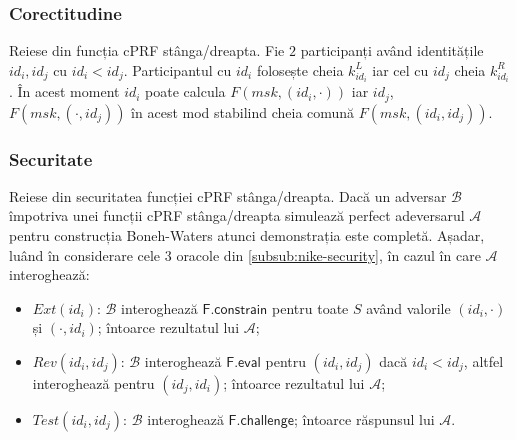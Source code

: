 \documentclass[oneside, 12pt]{book}
\begin{document}
\subsubsection{Corectitudine}

Reiese din funcția cPRF stânga/dreapta. Fie $2$ participanți având identitățile $id_i, id_j$ cu $id_i < id_j$. Participantul cu $id_i$ folosește cheia $k^{L}_{id_i}$ iar cel cu $id_j$ cheia $k^{R}_{id_i}$. În acest moment $id_i$ poate calcula $F(msk, (id_i, \cdot))$ iar $id_j$, $F(msk, (\cdot, id_j))$ în acest mod stabilind cheia comună $F(msk, (id_i, id_j))$.

\subsubsection{Securitate}

Reiese din securitatea funcției cPRF stânga/dreapta. Dacă un adversar $\mathcal{B}$ împotriva unei funcții cPRF stânga/dreapta simulează perfect adeversarul $\mathcal{A}$ pentru construcția Boneh-Waters atunci demonstrația este completă. Așadar, luând în considerare cele $3$ oracole din \ref{subsub:nike-security}, în cazul în care $\mathcal{A}$ interoghează:
\begin{itemize}
	\item $Ext(id_i)$: $\mathcal{B}$ interoghează $\mathsf{F.constrain}$ pentru toate $S$ având valorile $(id_i, \cdot)$ și $(\cdot, id_i)$; întoarce rezultatul lui $\mathcal{A}$;
	\item $Rev(id_i, id_j)$: $\mathcal{B}$ interoghează $\mathsf{F.eval}$ pentru $(id_i, id_j)$ dacă $id_i < id_j$, altfel interoghează pentru $(id_j, id_i)$; întoarce rezultatul lui $\mathcal{A}$;
	\item $Test(id_i, id_j)$: $\mathcal{B}$ interoghează $\mathsf{F.challenge}$; întoarce răspunsul lui $\mathcal{A}$.
\end{itemize}




\end{document}
